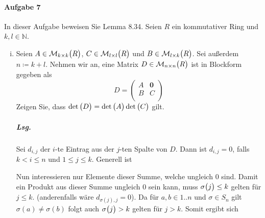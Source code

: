 \documentclass{scrreprt}
\newcommand{\sgn}{\text{sgn}}
\begin{document}
\paragraph{Aufgabe 7} In dieser Aufgabe beweisen Sie Lemma 8.34.
Seien $R$ ein kommutativer Ring und $k, l \in \mathbb{N}$.
\begin{enumerate}[(i)]
\item Seien $A \in \mathcal{M}_{k \times k}\qty\big(R)$,
  $C \in \mathcal{M}_{l \times l}\qty\big(R)$ und
  $B \in \mathcal{M}_{l \times k}\qty\big(R)$.
  Sei außerdem $n \coloneqq k + l$.
  Nehmen wir an, eine Matrix $D \in \mathcal{M}_{n \times n}\qty\big(R)$
  ist in Blockform gegeben als
  \[
    D = \begin{pmatrix}
      A & \textbf{0} \\
      B & C \\
    \end{pmatrix}
  \]
  Zeigen Sie, dass $\det\qty\big(D) = \det\qty\big(A)\det\qty\big(C)$ gilt.

  \subparagraph{Lsg.} Sei $d_{i, j}$ der $i$-te Eintrag aus der $j$-ten Spalte
  von $D$.
  Dann ist $d_{i, j} = 0$, falls $k < i \leq n$ und $1 \leq j \leq k$.
  Generell ist
  Nun interessieren nur Elemente dieser Summe, welche ungleich $0$ sind.
  Damit ein Produkt aus dieser Summe ungleich $0$ sein kann, muss
  $\sigma\qty\big(j) \leq k$ gelten für $j \leq k$.
  (anderenfalls wäre $d_{\sigma(j), j} = 0$).
  Da für $a, b \in 1 .. n$ und $\sigma \in S_n$ gilt $\sigma(a) \ne \sigma(b)$
  folgt auch $\sigma\qty\big(j) > k$ gelten für $j > k$.
  Somit ergibt sich


\end{enumerate}
\end{document}
